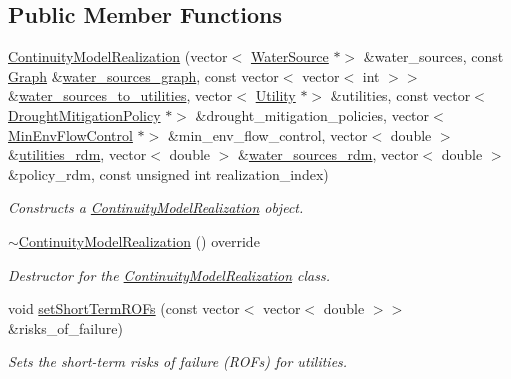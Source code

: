 \subsection*{Public Member Functions}
\begin{DoxyCompactItemize}
\item 
\mbox{\hyperlink{classContinuityModelRealization_a641c096ac73586597b3e21a5d516c923}{Continuity\+Model\+Realization}} (vector$<$ \mbox{\hyperlink{classWaterSource}{Water\+Source}} $\ast$$>$ \&water\+\_\+sources, const \mbox{\hyperlink{classGraph}{Graph}} \&\mbox{\hyperlink{classContinuityModel_a563401588c6fa622f03393909a3522db}{water\+\_\+sources\+\_\+graph}}, const vector$<$ vector$<$ int $>$$>$ \&\mbox{\hyperlink{classContinuityModel_ae8516bcbbf52650190277fc8b06c1843}{water\+\_\+sources\+\_\+to\+\_\+utilities}}, vector$<$ \mbox{\hyperlink{classUtility}{Utility}} $\ast$$>$ \&utilities, const vector$<$ \mbox{\hyperlink{classDroughtMitigationPolicy}{Drought\+Mitigation\+Policy}} $\ast$$>$ \&drought\+\_\+mitigation\+\_\+policies, vector$<$ \mbox{\hyperlink{classMinEnvFlowControl}{Min\+Env\+Flow\+Control}} $\ast$$>$ \&min\+\_\+env\+\_\+flow\+\_\+control, vector$<$ double $>$ \&\mbox{\hyperlink{classContinuityModel_aa4a00b76da6295d2faa11e3dcaea1896}{utilities\+\_\+rdm}}, vector$<$ double $>$ \&\mbox{\hyperlink{classContinuityModel_ab7b8fa93a6f56b328e425e1ead6cfefa}{water\+\_\+sources\+\_\+rdm}}, vector$<$ double $>$ \&policy\+\_\+rdm, const unsigned int realization\+\_\+index)
\begin{DoxyCompactList}\small\item\em Constructs a \mbox{\hyperlink{classContinuityModelRealization}{Continuity\+Model\+Realization}} object. \end{DoxyCompactList}\item 
\mbox{\hyperlink{classContinuityModelRealization_afd53069e2f9ab96210ff153d16f01269}{$\sim$\+Continuity\+Model\+Realization}} () override
\begin{DoxyCompactList}\small\item\em Destructor for the \mbox{\hyperlink{classContinuityModelRealization}{Continuity\+Model\+Realization}} class. \end{DoxyCompactList}\item 
void \mbox{\hyperlink{classContinuityModelRealization_ae2c40328beb671fa9b10ecc2921b8375}{set\+Short\+Term\+R\+O\+Fs}} (const vector$<$ vector$<$ double $>$$>$ \&risks\+\_\+of\+\_\+failure)
\begin{DoxyCompactList}\small\item\em Sets the short-\/term risks of failure (R\+O\+Fs) for utilities. \end{DoxyCompactList}\item 

\end{DoxyCompactItemize}
